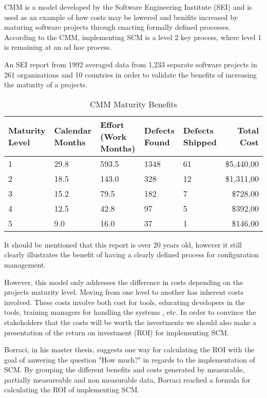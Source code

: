 \documentclass[10pt]{article}
\begin{document}
\noindent CMM is a model developed by the Software Engineering Institute (SEI) and is used as an example of how costs may be lowered and benifits increased by maturing software projects through enacting formally defined processes. According to the CMM, implementing SCM is a level 2 key process, where level 1 is remaining at an ad hoc process.

\noindent An SEI report \cite{Merant} from 1992 averaged data from 1,233 separate software projects in 261 organizations and 10 countries in order to validate the benefits of increasing the maturity of a projects.
\begin{table}[h!]
    \centering
        \begin{tabular}{| p{2cm} | p{2cm} | p{2cm} | l | l | r |}
         \hline
        Maturity Level & Calendar Months & Effort (Work Months) & Defects Found & Defects Shipped & Total Cost \\ \hline
        1 & 29.8 & 593.5 & 1348 & 61 & \$5,440,00 \\ \hline
        2 & 18.5 & 143.0 & 328 & 12 & \$1,311,00 \\ \hline
        3 & 15.2 & 79.5 & 182 & 7 & \$728,00 \\ \hline
        4 & 12.5 & 42.8 & 97 & 5 & \$392,00 \\ \hline
        5 & 9.0 & 16.0 & 37 & 1 & \$146,00 \\ \hline
    \end{tabular}
    \caption{CMM Maturity Benefits}
    \label{CMM}
\end{table}

\noindent It should be mentioned that this report is over 20 years old, however it still clearly illustrates the benefit of having a clearly defined process for configuration management. 

\noindent However, this model only addresses the difference in costs depending on the projects maturity level. Moving from one level to another has inherent costs involved. These costs involve both cost for tools, educating developers in the tools, training managers for handling the systems , etc. In order to convince the stakeholders that the costs will be worth the investments we should also make a presentation of the return on investment (ROI) for implementing SCM.

\noindent Borraci\cite{Borraci}, in his master thesis, suggests one way for calculating the ROI with the goal of anwering the question "How much?" in regards to the implementation of SCM. By grouping the different benefits and costs generated by measurable, partially measureable and non measurable data, Borraci reached a formula for calculating the ROI of implementing SCM.
\end{document}
